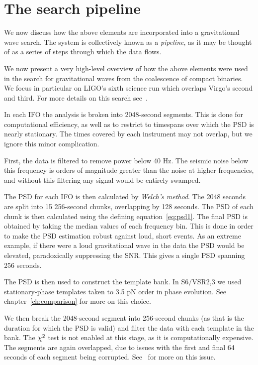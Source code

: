 \section{The search pipeline}
\label{sec:search_pipeline}

We now discuss how the above elements are incorporated into 
a gravitational wave search.  The system is collectively known as a
\emph{pipeline}, as it may be thought of as a series of steps through
which the data flows.

We now present a very high-level overview of how the above elements
were used in the search for gravitational waves from the coalescence
of compact binaries.  We focus in particular on LIGO's sixth science
run which overlaps Virgo's second and third.  For more details on this
search see~\cite{Capano:thesis}.

In each IFO the analysis is broken into 2048-second segments.  This is
done for computational efficiency, as well as to restrict to timespans
over which the PSD is nearly stationary.  The times covered by each
instrument may not overlap, but we ignore this minor complication.

First, the data is filtered to remove power below 40 Hz.  The seismic
noise below this frequency is orders of magnitude greater than  the
noise at higher frequencies, and without this filtering any signal
would be entirely swamped.

The PSD for each IFO is then calculated by \emph{Welch's method}.  The
2048 seconds are split into 15 256-second chunks, overlapping by 128
seconds.  The PSD of each chunk is then calculated using the defining
equation~\ref{eq:psd1}.  The final PSD is obtained by taking the
median values of each frequency bin. This is done in order to make the
PSD estimation robust against loud, short events.  As an extreme
example, if there were a loud gravitational wave in the data the PSD
would be elevated, paradoxically suppressing the SNR.  This gives a
single PSD spanning 256 seconds.

The PSD is then used to construct the template bank.  In S6/VSR2,3 we
used stationary-phase templates taken to 3.5 pN order in phase
evolution.  See chapter~\ref{ch:comparison} for more on this choice.

We then break the 2048-second segment into 256-second chunks (as that
is the duration for which the PSD is valid) and filter the data with
each template in the bank.  The $\chi^2$ test is not enabled at this
stage, as it is computationally expensive.  The segments are again
overlapped, due to issues with the first and final 64 seconds of each
segment being corrupted.  See~\cite{DBrownThesis} for more on this
issue.

